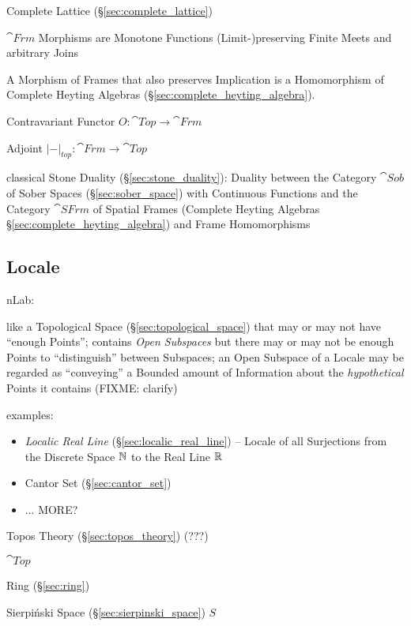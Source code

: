 Complete Lattice (\S\ref{sec:complete_lattice})

$\cat{Frm}$ Morphisms are Monotone Functions (Limit-)preserving Finite
Meets and arbitrary Joins

A Morphism of Frames that also preserves Implication is a Homomorphism
of Complete Heyting Algebras (\S\ref{sec:complete_heyting_algebra}).

Contravariant Functor $O : \cat{Top} \rightarrow \cat{Frm}$

Adjoint $|-|_{top} : \cat{Frm} \rightarrow \cat{Top}$ %

classical Stone Duality (\S\ref{sec:stone_duality}): Duality between the
Category $\cat{Sob}$ of Sober Spaces (\S\ref{sec:sober_space}) with Continuous
Functions and the Category $\cat{SFrm}$ of Spatial Frames (Complete Heyting
Algebras \S\ref{sec:complete_heyting_algebra}) and Frame Homomorphisms



\subsection{Locale}\label{sec:locale}

nLab:

like a Topological Space (\S\ref{sec:topological_space}) that may or may not
have ``enough Points''; contains \emph{Open Subspaces} but there may or may not
be enough Points to ``distinguish'' between Subspaces; an Open Subspace of a
Locale may be regarded as ``conveying'' a Bounded amount of Information about
the \emph{hypothetical} Points it contains (FIXME: clarify)

examples:
\begin{itemize}
  \item \emph{Localic Real Line} (\S\ref{sec:localic_real_line}) -- Locale of
    all Surjections from the Discrete Space $\mathbb{N}$ to the Real Line $\mathbb{R}$
  \item Cantor Set (\S\ref{sec:cantor_set})
  \item ... MORE?
\end{itemize}

Topos Theory (\S\ref{sec:topos_theory}) (???)

$\cat{Top}$

Ring (\S\ref{sec:ring})

Sierpi\'nski Space (\S\ref{sec:sierpinski_space}) $S$

